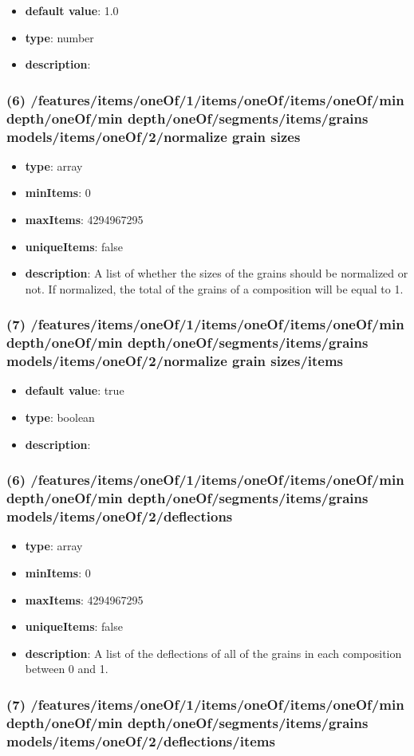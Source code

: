 \begin{itemize}[leftmargin=7em]\item {\bf default value}: 1.0
\item {\bf type}: number
\item {\bf description}: 
\end{itemize}\subsubsection{(6) /features/items/oneOf/1/items/oneOf/items/oneOf/min depth/oneOf/min depth/oneOf/segments/items/grains models/items/oneOf/2/normalize grain sizes}
\begin{itemize}[leftmargin=6em]\item {\bf type}: array
\item {\bf minItems}: 0
\item {\bf maxItems}: 4294967295
\item {\bf uniqueItems}: false
\item {\bf description}: A list of whether the sizes of the grains should be normalized or not. If normalized, the total of the grains of a composition will be equal to 1.
\end{itemize}\subsubsection{(7) /features/items/oneOf/1/items/oneOf/items/oneOf/min depth/oneOf/min depth/oneOf/segments/items/grains models/items/oneOf/2/normalize grain sizes/items}
\begin{itemize}[leftmargin=7em]\item {\bf default value}: true
\item {\bf type}: boolean
\item {\bf description}: 
\end{itemize}\subsubsection{(6) /features/items/oneOf/1/items/oneOf/items/oneOf/min depth/oneOf/min depth/oneOf/segments/items/grains models/items/oneOf/2/deflections}
\begin{itemize}[leftmargin=6em]\item {\bf type}: array
\item {\bf minItems}: 0
\item {\bf maxItems}: 4294967295
\item {\bf uniqueItems}: false
\item {\bf description}: A list of the deflections of all of the grains in each composition between 0 and 1.
\end{itemize}\subsubsection{(7) /features/items/oneOf/1/items/oneOf/items/oneOf/min depth/oneOf/min depth/oneOf/segments/items/grains models/items/oneOf/2/deflections/items}
